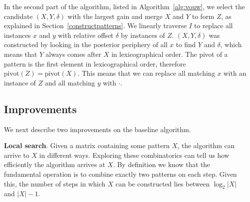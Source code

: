 \documentclass{llncs}
\begin{document}
In the second part of the algorithm, listed in Algorithm~\ref{alg:vouw}, we select the candidate $(X,Y,\delta)$ with the largest gain and merge $X$ and $Y$ to form $Z$, as explained in Section~\ref{constructpatterns}. We linearly traverse $I$ to replace all instances $x$ and $y$ with relative offset $\delta$  by instances of $Z$. $(X,Y,\delta)$ was constructed by looking in the posterior periphery of all $x$ to find $Y$ and $\delta$, which means that $Y$ always comes after $X$ in lexicographical order. The pivot of a pattern is the first element in lexicographical order, therefore $\mathrm{pivot}(Z) = \mathrm{pivot}(X)$. This means that we can replace all matching $x$ with an instance of $Z$ and all matching $y$ with $\cdot$. %

\subsection{Improvements}
\label{improvements}

We next describe two improvements on the baseline algorithm. 

\smallskip
\noindent \textbf{Local search}. Given a matrix containing some pattern $X$, the algorithm can arrive to $X$ in different ways. Exploring these combinatorics can tell us how efficiently the algorithm arrives at $X$. By definition we know that the fundamental operation is to combine exactly two patterns on each step. Given this, the number of steps in which $X$ can be constructed lies between $\log_2|X|$ and $|X|-1$. 


\end{document}
